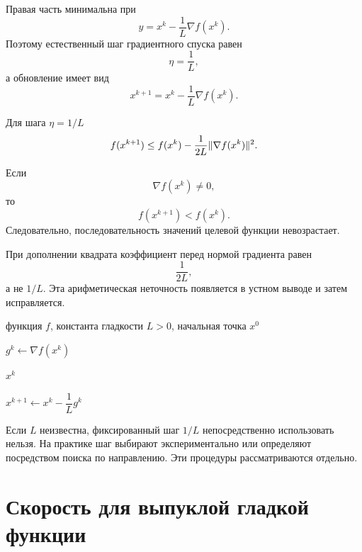 Правая часть минимальна при
\[
    y
    =
    x^k-\frac1L\nabla f(x^k).
\]
Поэтому естественный шаг градиентного спуска равен
\[
    \eta=\frac1L,
\]
а обновление имеет вид
\[
    x^{k+1}
    =
    x^k-\frac1L\nabla f(x^k).
\]

\begin{theorem}
Для шага \(\eta=1/L\)
\[
    f(x^{k+1})
    \le
    f(x^k)
    -
    \frac{1}{2L}
    \lVert\nabla f(x^k)\rVert^2.
\]
\end{theorem}

Если
\[
    \nabla f(x^k)\ne0,
\]
то
\[
    f(x^{k+1})<f(x^k).
\]
Следовательно, последовательность значений целевой функции
невозрастает.

\begin{remark}
При дополнении квадрата коэффициент перед нормой градиента равен
\[
    \frac{1}{2L},
\]
а не \(1/L\). Эта арифметическая неточность появляется в устном
выводе и затем исправляется.
\end{remark}



\begin{algorithm}[H]
\caption{Градиентный спуск для \(L\)-гладкой функции}
\label{alg:lecture11-gradient-descent}
\begin{algorithmic}[1]

\Require
функция \(f\), константа гладкости \(L>0\),
начальная точка \(x^0\)


    \State
    \(g^k\gets\nabla f(x^k)\)


        \State
        \Return \(x^k\)

    \EndIf

    \State
    \(x^{k+1}\gets x^k-\dfrac1L g^k\)

\EndFor

\end{algorithmic}
\end{algorithm}

Если \(L\) неизвестна, фиксированный шаг \(1/L\) непосредственно
использовать нельзя. На практике шаг выбирают экспериментально или
определяют посредством поиска по направлению. Эти процедуры
рассматриваются отдельно.

\section{Скорость для выпуклой гладкой функции}

